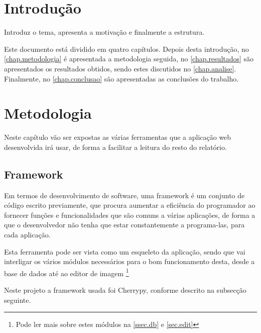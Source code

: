\documentclass{report}
\begin{document}
\tableofcontents


\clearpage
{}

\chapter{Introdução}
\label{chap.introducao}

Introduz o tema, apresenta a motivação e finalmente a estrutura.

Este documento está dividido em quatro capítulos.
Depois desta introdução,
no \autoref{chap.metodologia} é apresentada a metodologia seguida,
no \autoref{chap.resultados} são apresentados os resultados obtidos,
sendo estes discutidos no \autoref{chap.analise}.
Finalmente, no \autoref{chap.conclusao} são apresentadas
as conclusões do trabalho.

\chapter{Metodologia}
\label{chap.metodologia}
Neste capítulo vão ser expostas as várias ferramentas que a aplicação web desenvolvida irá usar, de forma a facilitar a leitura do resto do relatório.

\section{Framework}


Em termos de desenvolvimento de software, uma framework é um conjunto de código escrito previamente, que procura aumentar a eficiência do programador ao fornecer funções e funcionalidades que são comuns a várias aplicações, de forma a que o desenvolvedor não tenha que estar constantemente a programa-las, para cada aplicação.

Esta ferramenta pode ser vista como um esqueleto da aplicação, sendo que vai interligar os vários módulos necessários para o bom funcionamento desta, desde a base de dados até ao editor de imagem  
\footnote{Pode ler mais sobre estes módulos na \autoref{ssec.db} e \autoref{sec.edit}}

Neste projeto a framework usada foi Cherrypy, conforme descrito na subsecção seguinte.
\end{document}
